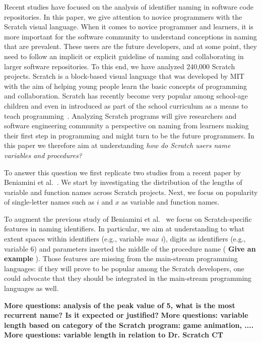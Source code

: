 \documentclass[conference]{IEEEtran}
\newcommand{\todo}[1]{ \textbf{#1} }
\begin{document}
Recent studies have focused on the analysis of identifier naming in software code repositories. 
In this paper, we give attention to novice programmers with the Scratch visual language. 
When it comes to novice programmer and learners, it is more important for the software community to understand conceptions in naming that are prevalent. 
These users are the future developers, and at some point, they need to follow an implicit or explicit guideline of naming and collaborating in larger software repositories. 
To this end, we have analyzed 240,000 Scratch projects. 
Scratch is a block-based visual language that was developed by MIT with the aim of helping young people learn the basic concepts of programming and collaboration.
Scratch has recently become very popular among school-age children and even in introduced as part of the school curriculum as a means to teach programming~\cite{SaezLopez}.
Analyzing Scratch programs will give researchers and software engineering community a perspective on naming from learners making their first step in programming and might turn to be the future programmers. In this paper we therefore aim at understanding \emph{how do Scratch users name variables and procedures? }

To answer this question we first replicate two studies from a recent paper by Beniamini et al.~\cite{Beniamini}.
We start by investigating the distribution of the lengths of variable and function names across Scratch projects. 
Next, we focus on popularity of single-letter names such as $i$ and $x$ as variable and function names.

To augment the previous study of Beniamini et al.~\cite{Beniamini} we focus on Scratch-specific features in naming identifiers.
In particular, we aim at understanding to what extent spaces within identifiers (e.g., variable \emph{max i}), digits as identifiers (e.g., variable 6) and parameters inserted the middle of the procedure name (\todo{Give an example}).
Those features are missing from the main-stream programming languages: if they will prove to be popular among the Scratch developers, one could advocate that they should be integrated in the main-stream programming languages as well.

\todo{More questions: analysis of the peak value of 5, what is the most recurrent name? Is it expected or justified?}
\todo{More questions: variable length based on category of the Scratch program: game animation, ....}
\todo{More questions: variable length in relation to Dr. Scratch CT}
 
\end{document}

